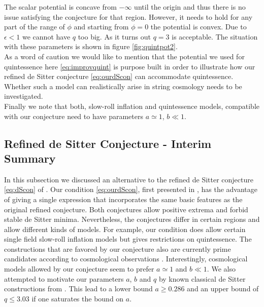 \documentclass[a4paper,12pt,twoside,openright]{report}
\begin{document}
The scalar potential is concave from $-\infty$ until the origin and thus there is no issue satisfying the conjecture for that region. However, it needs to hold for any part of the range of $\phi$ and starting from $\phi = 0$ the potential is convex. Due to $\epsilon < 1$ we cannot have $q$ too big. As it turns out $q=3$ is acceptable. The situation with these parameters is shown in figure \ref{fig:quintpot2}.\\
As a word of caution we would like to mention that the potential we used for quintessence here \eqref{eq:improvquint} is purpose built in order to illustrate how our refined de Sitter conjecture \eqref{eq:ourdScon} can accommodate quintessence. Whether such a model can realistically arise in string cosmology needs to be investigated.\\
Finally we note that both, slow-roll inflation and quintessence models, compatible with our conjecture need to have parameters $a \simeq 1$, $b\ll1$. 

\subsection{Refined de Sitter Conjecture - Interim Summary}
In this subsection we discussed an alternative to the refined de Sitter conjecture \eqref{eq:dScon} of \cite{Ooguri:2018wrx}. Our condition \eqref{eq:ourdScon}, first presented in \cite{Andriot:2018mav}, has the advantage of giving a single expression that incorporates the same basic features as the original refined conjecture. Both conjectures allow positive extrema and forbid stable de Sitter minima. Nevertheless, the conjectures differ in certain regions and allow different kinds of models. For example, our condition does allow certain single field slow-roll inflation models but gives restrictions on quintessence. The constructions that are favored by our conjecture also are currently prime candidates according to cosmological observations \cite{Planck:2018jri}. Interestingly, cosmological models allowed by our conjecture seem to prefer $a\simeq 1$ and $b \ll 1$. We also attempted to motivate our parameters $a$, $b$ and $q$ by known classical de Sitter constructions from \cite{Danielsson:2012et,Roupec:2018mbn}. This lead to a lower bound $a \geq 0.286$ and an upper bound of $q\leq 3.03$ if one saturates the bound on $a$.
\end{document}
